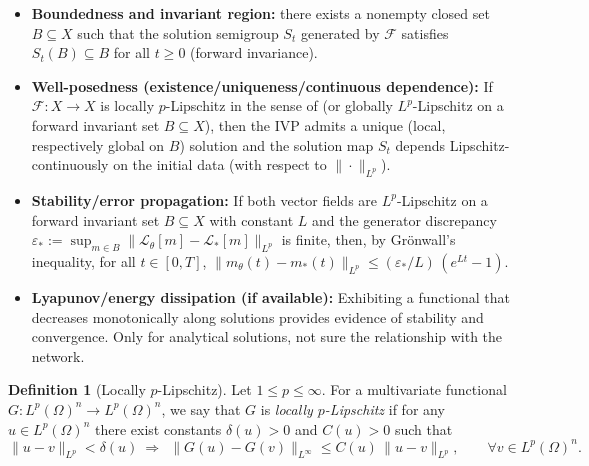 \documentclass[11pt,a4paper]{article}
\theoremstyle{plain}
\theoremstyle{definition}
\newtheorem{definition}[theorem]{Definition}
\theoremstyle{remark}
\begin{document}
\begin{itemize}
	\item \textbf{Boundedness and invariant region:}
	      there exists a nonempty closed set $B\subseteq X$ such that the solution semigroup $S_t$ generated by $\mathcal{F}$ satisfies $S_t(B)\subseteq B$ for all $t\ge 0$ (forward invariance).

	\item \textbf{Well-posedness (existence/uniqueness/continuous dependence):}
	      If $\mathcal{F}:X\to X$ is locally $p$-Lipschitz in the sense of  (or globally $L^p$-Lipschitz on a forward invariant set $B\subseteq X$), then the IVP admits a unique (local, respectively global on $B$) solution and the solution map $S_t$ depends Lipschitz-continuously on the initial data (with respect to $\|\cdot\|_{L^p}$).



	\item \textbf{Stability/error propagation:}
	      If both vector fields are $L^p$-Lipschitz on a forward invariant set $B\subseteq X$ with constant $L$ and the generator discrepancy $\varepsilon_*:=\sup_{m\in B}\|\mathcal{L}_\theta[m]-\mathcal{L}_*[m]\|_{L^p}$ is finite, then, by Grönwall's inequality, for all $t\in[0,T]$,
	      $\|m_\theta(t)-m_*(t)\|_{L^p} \le (\varepsilon_*/L)\,(e^{L t}-1)$.

	\item \textbf{Lyapunov/energy dissipation (if available):}
	      Exhibiting a functional that decreases monotonically along solutions provides evidence of stability and convergence. Only for analytical solutions, not sure the relationship with the network.
\end{itemize}



\begin{definition}[Locally $p$-Lipschitz]\label{def:locally-p-Lip}
	Let $1\le p\le \infty$. For a multivariate functional $G: L^p(\Omega)^n \to L^p(\Omega)^n$, we say that $G$ is \emph{locally $p$-Lipschitz} if for any $u\in L^p(\Omega)^n$ there exist constants $\delta(u)>0$ and $C(u)>0$ such that
	\[
		\|u-v\|_{L^p} < \delta(u)
		\ \Longrightarrow\ \
		\|G(u)-G(v)\|_{L^{\infty}} \le C(u)\,\|u-v\|_{L^p},
		\qquad \forall v\in L^p(\Omega)^n.
	\]
\end{definition}
\end{document}
